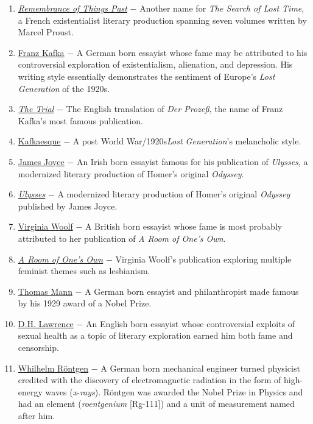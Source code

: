 \documentclass[12pt]{article}
\begin{document}
\begin{flushleft}
\begin{enumerate}
\item \underline{\emph{Remembrance of Things Past}} $-$ Another name for \emph{The Search of Lost Time}, a French existentialist literary production spanning seven volumes written by Marcel Proust.

\item \underline{Franz Kafka} $-$ A German born essayist whose fame may be attributed to his controversial exploration of existentialism, alienation, and depression. His writing style essentially demonstrates the sentiment of Europe's \emph{Lost Generation} of the 1920s.

\item \underline{\emph{The Trial}} $-$ The English translation of \emph{Der Proze\ss}, the name of Franz Kafka's most famous publication. 

\item \underline{Kafkaesque} $-$ A post World War/1920s\emph{Lost Generation}'s melancholic style.

\item \underline{James Joyce} $-$ An Irish born essayist famous for his publication of \emph{Ulysses}, a modernized literary production of Homer's original \emph{Odyssey}.

\item \underline{\emph{Ulysses}} $-$ A modernized literary production of Homer's original \emph{Odyssey} published by James Joyce.

\item \underline{Virginia Woolf} $-$ A British born essayist whose fame is most probably attributed to her publication of \emph{A Room of One's Own}. 

\item \underline{\emph{A Room of One's Own}} $-$ Virginia Woolf's publication exploring multiple feminist themes such as lesbianism.

\item \underline{Thomas Mann} $-$ A German born essayist and philanthropist made famous by his 1929 award of a Nobel Prize.

\item \underline{D.H. Lawrence} $-$ An English born essayist whose controversial exploits of sexual health as a topic of literary exploration earned him both fame and censorship.

\item \underline{Whilhelm R\"ontgen} $-$ A German born mechanical engineer turned physicist credited with the discovery of electromagnetic radiation in the form of high-energy waves (\emph{x}-\emph{rays}). R\"ontgen was awarded the Nobel Prize in Physics and had an element (\emph{roentgenium} [Rg-111]) and a unit of measurement named after him.  


\end{enumerate}
\end{flushleft}
\end{document}
